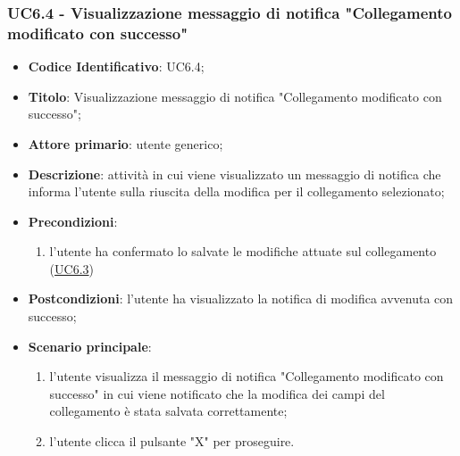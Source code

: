 	\subsubsection{UC6.4 - Visualizzazione messaggio di notifica "Collegamento modificato con successo"}
		\begin{itemize}
			\item\textbf{Codice Identificativo}: UC6.4;
			\item\textbf{Titolo}: Visualizzazione messaggio di notifica "Collegamento modificato con successo";
			\item\textbf{Attore primario}: utente generico;
			\item\textbf{Descrizione}: attività in cui viene visualizzato un messaggio di notifica che informa l'utente sulla riuscita della modifica per il collegamento selezionato; 
			\item\textbf{Precondizioni}: 
				\begin{enumerate}
					\item l'utente ha confermato lo salvate le modifiche attuate sul collegamento (\hyperref[par:UC6.3]{UC6.3})
				\end{enumerate}
			\item\textbf{Postcondizioni}: l'utente ha visualizzato la notifica di modifica avvenuta con successo;				
			\item\textbf{Scenario principale}:
				\begin{enumerate}
					\item l'utente visualizza il messaggio di notifica "Collegamento modificato con successo" in cui viene notificato che la modifica dei campi del collegamento è stata salvata correttamente;
					\item l'utente clicca il pulsante "X" per proseguire.		
				\end{enumerate}		
		\end{itemize}

\label{par:UC6.5}
